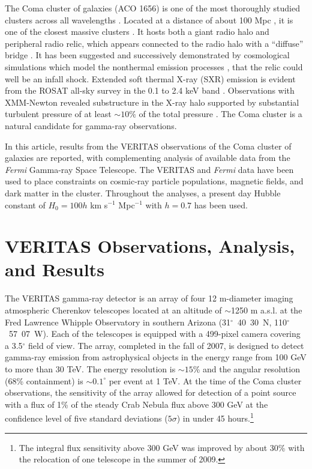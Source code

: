 \documentclass[12pt,manuscript]{aastex}
\def\Fermi{{\em Fermi}\xspace}
\begin{document}
The Coma cluster of galaxies (ACO 1656) is one of the most thoroughly studied clusters across all
wavelengths \citep{article:Voges_etal:1999}. Located at a distance of about 100 Mpc
\citep[$z=0.023$;][]{article:StrubleRood:1999}, it is one of the closest massive clusters \citep[$M
\sim10^{15}M_{\odot}$;][]{article:Smith:1983, article:Kubo_etal:2008}. It hosts both a giant radio
halo \citep{article:Giovannini_etal:1993,article:Thierbach_etal:2003} and peripheral radio relic,
which appears connected to the radio halo with a ``diffuse'' bridge \citep[see discussion
in][]{article:BrownRudnick:2010}. It has been suggested \citep{article:Ensslin_etal:1998} and
successively demonstrated by cosmological simulations which model the nonthermal emission
processes \citep{article:PfrommerEnsslinSpringel:2008, article:Pfrommer:2008,
article:Battaglia_etal:2009, article:Skillman_etal:2011}, that the relic could well be an infall
shock. Extended soft thermal X-ray (SXR) emission is evident from the ROSAT all-sky survey in the
0.1 to 2.4 keV band \citep{article:BrielHenryBohringer:1992}. Observations with XMM-Newton
\citep{article:Briel_etal:2001} revealed substructure in the X-ray halo supported by substantial
turbulent pressure of at least $\sim 10 \%$ of the total pressure
\citep{article:Schuecker_etal:2004}. The Coma cluster is a natural candidate for gamma-ray
observations.

In this article, results from the VERITAS observations of the Coma cluster of galaxies are
reported, with complementing analysis of available data from the \Fermi Gamma-ray Space Telescope.
The VERITAS and \Fermi data have been used to place constraints on cosmic-ray particle populations,
magnetic fields, and dark matter in the cluster. Throughout the analyses, a present day Hubble
constant of $H_{0} = 100h$ km s$^{-1}$ Mpc$^{-1}$ with $h=0.7$ has been used.

%
%

\section{VERITAS Observations, Analysis, and Results}
The VERITAS gamma-ray detector \citep{article:Weekes_etal:2002} is an array of four 12 m-diameter
imaging atmospheric Cherenkov telescopes \citep{article:Holder_etal:2006} located at an
altitude of $\sim$1250 m a.s.l. at the Fred Lawrence Whipple Observatory in southern Arizona
(31$^{\circ}$~40\arcmin~30\arcsec~N, 110$^{\circ}$~57\arcmin~07\arcsec~W). Each of the telescopes
is equipped with a 499-pixel camera covering a 3.5$^{\circ}$ field of view. The array, completed in
the fall of 2007, is designed to detect gamma-ray emission from astrophysical objects in the
energy range from 100 GeV to more than 30 TeV. The energy resolution is $\sim 15$\% and the angular
resolution (68\% containment) is $\sim 0.1^{\circ}$ per event at 1 TeV. At the time of the Coma
cluster observations, the sensitivity of the array allowed for detection of a point source with a
flux of 1\% of the steady Crab Nebula flux above 300 GeV at the confidence level of five standard
deviations ($5\sigma$) in under 45 hours.\footnote{The integral flux sensitivity above 300 GeV was
improved by about 30\% with the relocation of one telescope in the summer of 2009.}
\end{document}
